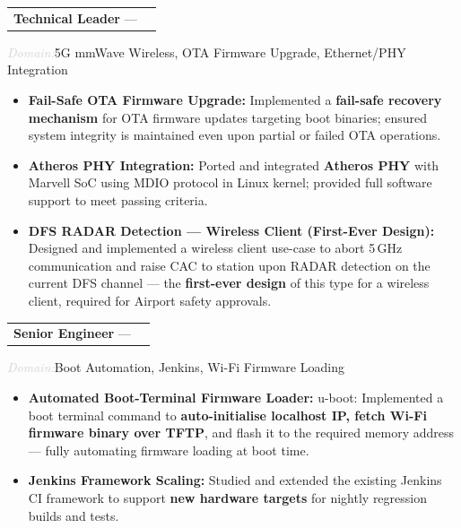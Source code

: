 \documentclass[10pt, a4paper]{article}
\makeatletter
\newcommand{\cventry}[3]{%
  \noindent
  \begin{tabularx}{\linewidth}{@{}X r@{}}
    \textbf{#1} --- \textit{#2} & \textcolor{lightgray}{\small #3}
  \end{tabularx}
  \vspace{2pt}
}
\newcommand{\clientinfo}[2]{%
  \noindent\textcolor{lightgray}{\small\textit{#1:}}\enspace#2\par
}
\makeatother
\begin{document}
\cventry{Technical Leader}{\CompanyIII{}}{\CompanyIIIExp{}}
\clientinfo{Domain}{5G mmWave Wireless, OTA Firmware Upgrade, Ethernet/PHY Integration}

\begin{itemize}
  \item \textbf{Fail-Safe OTA Firmware Upgrade:}
        Implemented a \textbf{fail-safe recovery mechanism} for OTA firmware
        updates targeting boot binaries; ensured system integrity is maintained
        even upon partial or failed OTA operations.

  \item \textbf{Atheros PHY Integration:}
        Ported and integrated \textbf{Atheros PHY} with Marvell SoC using MDIO
        protocol in Linux kernel; provided full software support to meet
        passing criteria.

  \item \textbf{DFS RADAR Detection --- Wireless Client (First-Ever Design):}
        Designed and implemented a wireless client use-case to abort 5\,GHz
        communication and raise CAC to station upon RADAR detection on the
        current DFS channel --- the \textbf{first-ever design} of this type for
        a wireless client, required for Airport safety approvals.
\end{itemize}

\vspace{4pt}

\cventry{Senior Engineer}{\CompanyII{}}{\CompanyIIExp{}}
\clientinfo{Domain}{Boot Automation, Jenkins, Wi-Fi Firmware Loading}

\begin{itemize}
  \item \textbf{Automated Boot-Terminal Firmware Loader:}
        u-boot: Implemented a boot terminal command to \textbf{auto-initialise localhost
        IP, fetch Wi-Fi firmware binary over TFTP}, and flash it to the required
        memory address --- fully automating firmware loading at boot time.

  \item \textbf{Jenkins Framework Scaling:}
        Studied and extended the existing Jenkins CI framework to support
        \textbf{new hardware targets} for nightly regression builds and tests.
\end{itemize}
\end{document}
